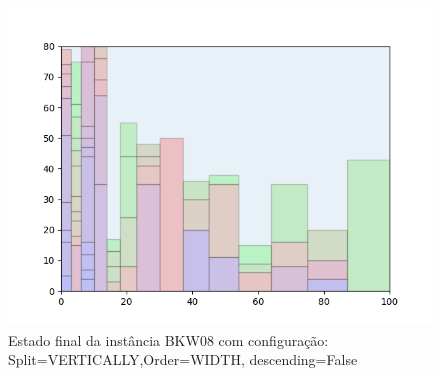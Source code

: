 \begin{figure}[H]
    \centering
    \caption[]{Estado final da instância BKW08 com configuração: Split=VERTICALLY,Order=WIDTH, descending=False}
    \label{fig:bkw08-vertically-width-false}
    \includegraphics[scale=0.5]{output/figures/bkw/bkw08/vertically/width/false/00}
\end{figure}